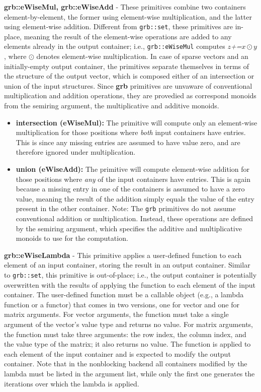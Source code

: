 	\textbf{grb::eWiseMul, grb::eWiseAdd} - These primitives combine two containers element-by-element, the former using element-wise multiplication, and the latter using element-wise addition. Different from \texttt{grb::set}, 
    these primitives are in-place, meaning the result of the element-wise operations are added to any elements already in the output container; i.e., \texttt{grb::eWiseMul} computes $z$\textit{+=}$x\odot y$, where $\odot$ denotes element-wise multiplication. 
    In case of sparse vectors and an initially-empty output container, the primitives separate themselves in terms of the structure of the output vector, which is composed either of an intersection or union of the input structures.
    Since \textbf{grb} primitives are unvaware of conventional multiplication and addition operations, they are provedied 
    as correspond monoids from the semiring argument, the multiplicative and additive monoids.
\begin{itemize}
  \item \textbf{intersection (eWiseMul):} The primitive will compute only an element-wise multiplication for those positions where \emph{both} input containers have entries. This is since any missing entries are assumed to have value zero, and are therefore ignored under multiplication.
  \item \textbf{union (eWiseAdd):} The primitive will compute element-wise addition for those positions where \emph{any} of the input containers have entries. This is again because a missing entry in one of the containers is assumed to have a zero value, meaning the result of the addition simply equals the value of the entry present in the other container.
  Note: The \texttt{grb} primitives do not assume conventional addition or multiplication. Instead, these operations are defined by the semiring argument, which specifies the additive and multiplicative monoids to use for the computation.
\end{itemize}

    \textbf{grb::eWiseLambda} - This primitive applies a user-defined function to each element of an input container, storing the result in an output container. 
    Similar to \texttt{grb::set}, this primitive is out-of-place; i.e., the output container is potentially overwritten with the results of applying the function to each element of the input container. 
    The user-defined function must be a callable object (e.g., a lambda function or a functor) that comes in two versions, one for vector and one for matrix arguments.
    For vector arguments, the function must take a single argument of the vector's value type and returns no value.
    For matrix arguments, the function must take three arguments: the row index, the column index, and the value type of the matrix; it also returns no value.
    The function is applied to each element of the input container and is expected to modify the output container.
    Note that in the nonblocking backend all containers modified by the lambda must be listed in the argument list, while only the first one generates the iterations over which the lambda is applied.

